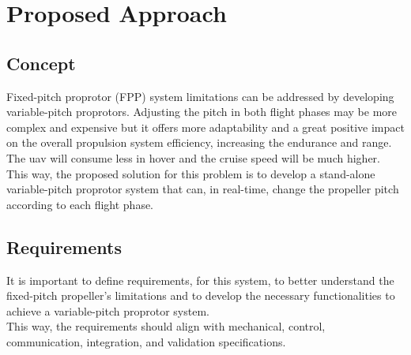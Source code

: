 \chapter{Proposed Approach}
\label{chap:Chapter4}

\section{Concept}
Fixed-pitch proprotor (FPP) system limitations can be addressed by developing variable-pitch proprotors.
Adjusting the pitch in both flight phases may be more complex and expensive but it offers more adaptability and a great positive impact on the overall propulsion system efficiency, increasing the endurance and range.
The \gls{uav} will consume less in hover and the cruise speed will be much higher.\\

This way, the proposed solution for this problem is to develop a stand-alone variable-pitch proprotor system that can, in real-time, change the propeller pitch according to each flight phase.


\section{Requirements}
It is important to define requirements, for this system, to better understand the fixed-pitch propeller's limitations and to develop the necessary functionalities to achieve a variable-pitch proprotor system.\\
This way, the requirements should align with mechanical, control, communication, integration, and validation specifications.

